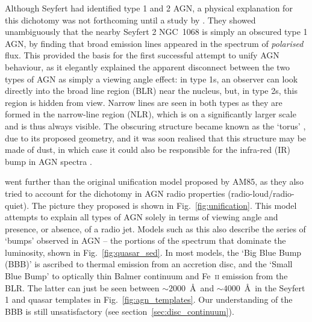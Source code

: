Although Seyfert had identified type 1 and 2 AGN, a physical explanation
for this dichotomy was not forthcoming until a study by \citet[][AM85]{antonucci1985}.
They showed unambiguously that the nearby Seyfert 2 NGC~1068 is simply an obscured
type 1 AGN, by finding that broad emission lines appeared in the spectrum of
{\em polarised} flux. This provided the basis for the first successful attempt
to unify AGN behaviour, as it elegantly  
explained the apparent disconnect between the two types of 
AGN as simply a viewing angle effect: in type 1s, an observer can look directly
into the broad line region (BLR) near the nucleus, but, in type 2s,
this region is hidden from view. Narrow lines are seen in both types as they
are formed in the narrow-line region (NLR), which is on a  
significantly larger scale and is thus always visible.
The obscuring structure became known as the `torus' \citep{krolik1986},  
due to its proposed geometry, and it was soon realised that this structure
may be made of dust, in which case it could also be responsible for the infra-red (IR)
bump in AGN spectra \citep{neugebauer1979}.

\citet[][UP95]{UP95} went further than the original unification model
proposed by AM85, as they also tried to account for the dichotomy in 
AGN radio properties (radio-loud/radio-quiet).
The picture they proposed is shown in Fig.~\ref{fig:unification}.
This model attempts to explain all types of AGN 
solely in terms of viewing angle
and presence, or absence, of a radio jet. Models such as this also 
describe the series of `bumps' observed in AGN -- the portions
of the spectrum that dominate the luminosity, shown in Fig.~\ref{fig:quasar_sed}. 
In most models, the `Big Blue Bump (BBB)' is ascribed to thermal 
emission from an accretion disc, and the `Small Blue Bump' to optically 
thin Balmer continuum and Fe~\textsc{ii} emission from the BLR.
The latter can just be seen between $\sim2000$~\AA\ and 
$\sim4000$~\AA\ in the Seyfert 1 and 
quasar templates in Fig.~\ref{fig:agn_templates}.
Our understanding of the BBB is still unsatisfactory 
(see section~\ref{sec:disc_continuum}).

